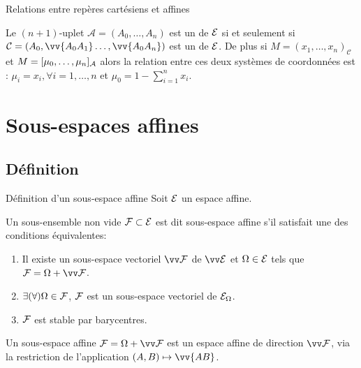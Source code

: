 \documentclass{m53beamer}
\begin{document}
  \begin{frame}{Relations entre repères cartésiens et affines}
    \begin{proposition}
      Le $(n+1)$-uplet $\mathcal{A}=(A_{0},\ldots,A_{n})$ est un  de $\mathcal{E}$ si et seulement si $\mathcal{C}=(A_{0},\vv{A_{0}A_{1}}\ldots,\vv{A_{0}A_{n}})$ est un  de $\mathcal{E}$.\pause\newline
      De plus si $M = (x_{1},\ldots,x_{n})_{\mathcal{C}}$ et $M = [\mu_{0},\ldots,\mu_{n}]_{\mathcal{A}}$ alors la relation entre ces deux systèmes de coordonnées est : $\mu_{i}=x_{i}, \forall i=1,\ldots,n$ et $\mu_{0}=1-\sum_{i=1}^{n}x_{i}$.
    \end{proposition}
  \end{frame}

\section{Sous-espaces affines}
\subsection{Définition}
  \begin{frame}{Définition d'un sous-espace affine}
      Soit $\mathcal{E}$ un espace affine.
      \begin{defprop}
      Un sous-ensemble non vide $\mathcal{F} \subset \mathcal{E}$ est dit \alert{sous-espace affine} s'il satisfait une des conditions équivalentes:
      \begin{enumerate}[<+(1)->]
        \item Il existe un sous-espace vectoriel $\ev{F}$ de $\ev{E}$ et $\Omega \in \mathcal{E}$ tels que $\ens{F}=\Omega+\ev{F}$.
        \item $\exists (\forall)\Omega \in \mathcal{F}$, $\mathcal{F}$ est un sous-espace vectoriel de $\mathcal{E}_{\Omega}$.
        \item $\mathcal{F}$ est stable par barycentres.
      \end{enumerate}
    \end{defprop}\pause
    Un sous-espace affine $\ens{F}=\Omega+\ev{F}$ est un espace affine de direction $\ev{F}$, via la restriction de l'application $(A,B)\mapsto\vv{AB}$.
  \end{frame}
\end{document}
